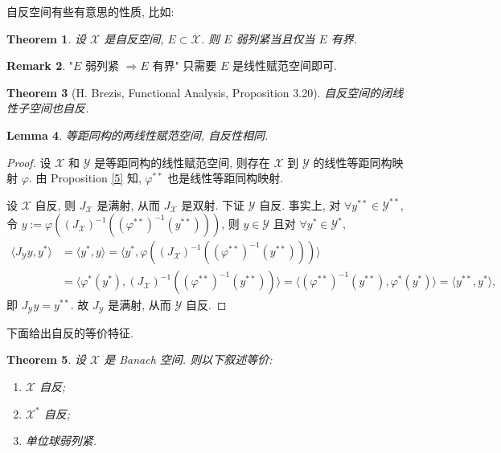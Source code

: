 \documentclass[a4paper,11pt]{article}
\newtheorem{theorem}{Theorem}[section]
\newtheorem{lemma}[theorem]{Lemma}
\theoremstyle{definition}
\newtheorem{remark}[theorem]{Remark}
\begin{document}
\begin{CJK*}{UTF8}{gbsn}
自反空间有些有意思的性质, 比如:

\begin{theorem}
    设 $ \mathcal{X} $ 是自反空间, $ E \subset \mathcal{X} $. 则
    $ E $ 弱列紧当且仅当 $ E $ 有界.
\end{theorem}

\begin{remark}
    "$ E $ 弱列紧 $ \Longrightarrow  E $ 有界" 只需要 $ E $ 是线性赋范空间即可.
\end{remark}

\begin{theorem}[H. Brezis, Functional Analysis, Proposition 3.20] \label{2}
    自反空间的闭线性子空间也自反.
\end{theorem}

\begin{lemma} \label{3}
    等距同构的两线性赋范空间, 自反性相同.
\end{lemma}

\begin{proof}
    设 $ \mathcal{X} $ 和 $ \mathcal{Y} $ 是等距同构的线性赋范空间, 
    则存在 $ \mathcal{X} $ 到 $ \mathcal{Y} $ 的线性等距同构映射 $ \varphi $.
    由 Proposition \ref{5} 知, $ \varphi^{**} $ 也是线性等距同构映射.
    
    设 $ \mathcal{X} $ 自反, 则 $ J_\mathcal{X} $ 是满射, 从而 $ J_\mathcal{X} $ 是双射. 
    下证 $ \mathcal{Y} $ 自反.
    事实上, 对 $ \forall y^{**} \in \mathcal{Y}^{**} $, 
    令 $ y := \varphi( (J_\mathcal{X})^{-1} ( (\varphi^{**})^{-1} (y^{**})) ) $, 
    则 $ y \in \mathcal{Y} $ 且对 $ \forall y^* \in \mathcal{Y}^* $,
    \begin{align*}
        \langle J_\mathcal{Y} y, y^* \rangle
            &= \langle y^*, y \rangle
            = \langle y^*, \varphi( (J_\mathcal{X})^{-1} ( (\varphi^{**})^{-1} (y^{**})) ) \rangle \\
            &= \langle \varphi^* (y^*), (J_\mathcal{X})^{-1} ( (\varphi^{**})^{-1} (y^{**})) \rangle
            = \langle  (\varphi^{**})^{-1} (y^{**}), \varphi^* (y^*) \rangle 
            = \langle y^{**}, y^* \rangle,
    \end{align*}
    即 $ J_\mathcal{Y} y = y^{**} $. 故 $ J_\mathcal{Y} $ 是满射, 从而 $ \mathcal{Y} $ 自反.
\end{proof}

下面给出自反的等价特征.

\begin{theorem}
    设 $ \mathcal{X} $ 是 Banach 空间. 则以下叙述等价:
    \begin{enumerate}[{\rm(i)}]
        \item $ \mathcal{X} $ 自反;
        \item $ \mathcal{X}^* $ 自反;
        \item 单位球弱列紧.
    \end{enumerate}
\end{theorem}


\end{CJK*}
\end{document}
